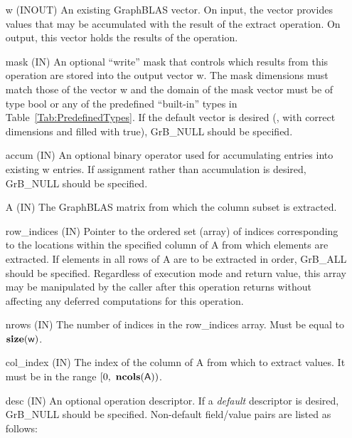 \begin{itemize}[leftmargin=1.1in]
    \item[{\sf w}]    ({\sf INOUT}) An existing GraphBLAS vector.  On input,
    the vector provides values that may be accumulated with the result of the
    extract operation.  On output, this vector holds the results of the
    operation.

    \item[{\sf mask}] ({\sf IN}) An optional ``write'' mask that controls which
    results from this operation are stored into the output vector {\sf w}. The 
    mask dimensions must match those of the vector {\sf w} and the domain of the
    {\sf mask} vector must be of type {\sf bool} or any of the predefined 
    ``built-in'' types in Table~\ref{Tab:PredefinedTypes}.  If the default
    vector is desired (\ie, with correct dimensions and filled with {\sf true}), 
    {\sf GrB\_NULL} should be specified.

    \item[{\sf accum}] ({\sf IN}) An optional binary operator used for accumulating
    entries into existing {\sf w} entries. If assignment rather than accumulation is
    desired, {\sf GrB\_NULL} should be specified.

    \item[{\sf A}]     ({\sf IN})  The GraphBLAS matrix from which the column subset
    is extracted.

    \item[{\sf row\_indices}] ({\sf IN}) Pointer to the ordered set (array) of 
    indices corresponding to the locations within the specified column of {\sf A} 
    from which elements are extracted.  If elements in all rows of {\sf A} are 
    to be extracted in order, {\sf GrB\_ALL} should be specified. Regardless of
    execution mode and return value, this array may be manipulated by the caller 
    after this operation returns without affecting any deferred computations for 
    this operation.
    
    \item[{\sf nrows}] ({\sf IN}) The number of indices in the {\sf row\_indices} array.
    Must be equal to $\bold{size}({\sf w})$.

    \item[{\sf col\_index}]  ({\sf IN}) The index of the column of {\sf A} from
    which to extract values.  It must be in the range $[0,\ \bold{ncols}({\sf A}))$.

    \item[{\sf desc}] ({\sf IN}) An optional operation descriptor. If
    a \emph{default} descriptor is desired, {\sf GrB\_NULL} should be
    specified. Non-default field/value pairs are listed as follows:  \\


\end{itemize}
